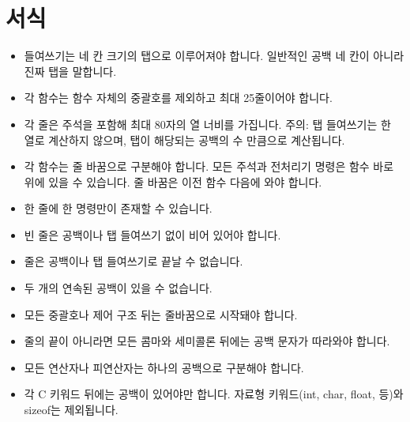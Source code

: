 \documentclass{42-ko}
\begin{document}
    \section{서식}

            \begin{itemize}

                \item 들여쓰기는 네 칸 크기의 탭으로 이루어져야 합니다.
                  일반적인 공백 네 칸이 아니라 진짜 탭을 말합니다.

                \item 각 함수는 함수 자체의 중괄호를 제외하고
                  최대 25줄이어야 합니다.

                \item 각 줄은 주석을 포함해 최대 80자의 열 너비를 가집니다.
                  주의: 탭 들여쓰기는 한 열로 계산하지 않으며,
                  탭이 해당되는 공백의 수 만큼으로 계산됩니다.

                \item 각 함수는 줄 바꿈으로 구분해야 합니다.
                  모든 주석과 전처리기 명령은 함수 바로 위에 있을 수 있습니다.
                  줄 바꿈은 이전 함수 다음에 와야 합니다.

                \item 한 줄에 한 명령만이 존재할 수 있습니다.

                \item 빈 줄은 공백이나 탭 들여쓰기 없이 비어 있어야 합니다.

                \item 줄은 공백이나 탭 들여쓰기로 끝날 수 없습니다.

                \item 두 개의 연속된 공백이 있을 수 없습니다.

                \item 모든 중괄호나 제어 구조 뒤는 줄바꿈으로 시작돼야 합니다.

                \item 줄의 끝이 아니라면 모든 콤마와 세미콜론 뒤에는 공백 문자가
                  따라와야 합니다.

                \item 모든 연산자나 피연산자는 하나의 공백으로 구분해야 합니다.

                \item 각 C 키워드 뒤에는 공백이 있어야만 합니다.
                  자료형 키워드(int, char, float, 등)와 sizeof는 제외됩니다.


\end{itemize}
\end{document}
